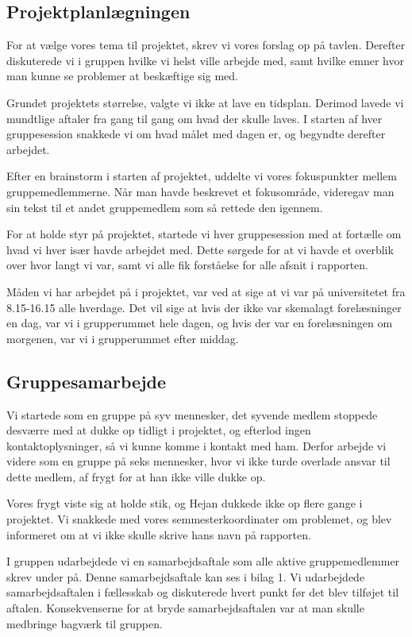 \subsection*{Projektplanlægningen}
For at vælge vores tema til projektet, skrev vi vores forslag op på tavlen. Derefter diskuterede vi i gruppen hvilke vi helst ville arbejde med, samt hvilke emner hvor man kunne se problemer at beskæftige sig med.

Grundet projektets størrelse, valgte vi ikke at lave en tidsplan. Derimod lavede vi mundtlige aftaler fra gang til gang om hvad der skulle laves. I starten af hver gruppesession snakkede vi om hvad målet med dagen er, og begyndte derefter arbejdet. 

Efter en brainstorm i starten af projektet, uddelte vi vores fokuspunkter mellem gruppemedlemmerne. Når man havde beskrevet et fokusområde, videregav man sin tekst til et andet gruppemedlem som så rettede den igennem. 

For at holde styr på projektet, startede vi hver gruppesession med at fortælle om hvad vi hver især havde arbejdet med. Dette sørgede for at vi havde et overblik over hvor langt vi var, samt vi alle fik forståelse for alle afsnit i rapporten.

Måden vi har arbejdet på i projektet, var ved at sige at vi var på universitetet fra 8.15-16.15 alle hverdage. Det vil sige at hvis der ikke var skemalagt forelæsninger en dag, var vi i grupperummet hele dagen, og hvis der var en forelæsningen om morgenen, var vi i grupperummet efter middag.


\subsection*{Gruppesamarbejde}
Vi startede som en gruppe på syv mennesker, det syvende medlem stoppede desværre med at dukke op tidligt i projektet, og efterlod ingen kontaktoplysninger, så vi kunne komme i kontakt med ham. Derfor arbejde vi videre som en gruppe på seks mennesker, hvor vi ikke turde overlade ansvar til dette medlem, af frygt for at han ikke ville dukke op.

Vores frygt viste sig at holde stik, og Hejan dukkede ikke op flere gange i projektet. Vi snakkede med vores semmesterkoordinater om problemet, og blev informeret om at vi ikke skulle skrive hans navn på rapporten.  

I gruppen udarbejdede vi en samarbejdsaftale som alle aktive gruppemedlemmer skrev under på. Denne samarbejdsaftale kan ses i bilag 1. Vi udarbejdede samarbejdsaftalen i fællesskab og diskuterede hvert punkt før det blev tilføjet til aftalen. Konsekvenserne for at bryde samarbejdsaftalen var at man skulle medbringe bagværk til gruppen. 

